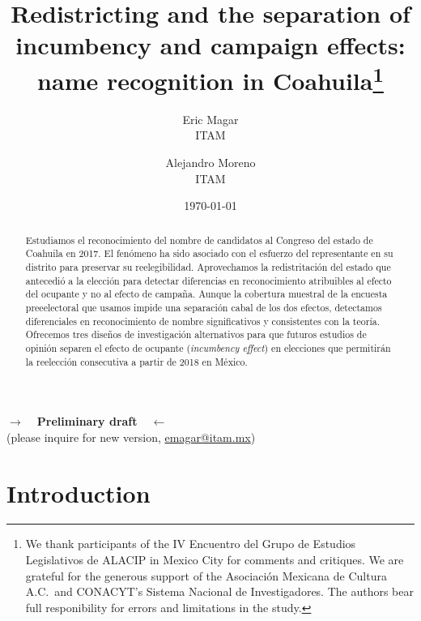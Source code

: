 \documentclass[letter,12pt]{article}
\begin{document}
\title{Redistricting and the separation of incumbency and campaign effects: name recognition in Coahuila\thanks{We thank participants of the IV Encuentro del Grupo de Estudios Legislativos de ALACIP in Mexico City for comments and critiques. We are grateful for the generous support of the Asociación Mexicana de Cultura A.C.\ and CONACYT's Sistema Nacional de Investigadores. The authors bear full responibility for errors and limitations in the study.}}
\author{Eric Magar  \\ ITAM \and
        Alejandro Moreno \\ ITAM 
}
\date{\today}
\maketitle

\begin{center} \textbf{$\rightarrow$~~Preliminary draft~~$\leftarrow$} \\ (please inquire for new version, \small{\url{emagar@itam.mx}})  \end{center}

\begin{abstract}
\noindent Estudiamos el reconocimiento del nombre de candidatos al Congreso del estado de Coahuila en 2017. El fenómeno ha sido asociado con el esfuerzo del representante en su distrito para preservar su reelegibilidad. Aprovechamos la redistritación del estado que antecedió a la elección para detectar diferencias en reconocimiento atribuibles al efecto del ocupante y no al efecto de campaña. Aunque la cobertura muestral de la encuesta preeelectoral que usamos impide una separación cabal de los dos efectos, detectamos diferenciales en reconocimiento de nombre significativos y consistentes con la teoría. Ofrecemos tres diseños de investigación alternativos para que futuros estudios de opinión separen el efecto de ocupante (\emph{incumbency effect}) en elecciones que permitirán la reelección consecutiva a partir de 2018 en México. 
\end{abstract}


\onehalfspacing

\section{Introduction}
\end{document}
